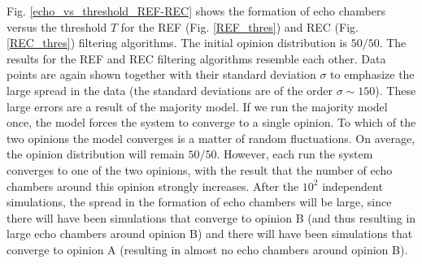 \documentclass[11 pt , letterpaper , twoside , openright]{book}
\begin{document}
Fig. \ref{echo_vs_threshold_REF-REC} shows the formation of echo chambers versus the threshold $T$ for the REF (Fig. \ref{REF_thres}) and REC (Fig. \ref{REC_thres}) filtering algorithms. The initial opinion distribution is $50/50$. The results for the REF and REC filtering algorithms resemble each other. Data points are again shown together with their standard deviation $\sigma$ to emphasize the large spread in the data (the standard deviations are of the order $\sigma \sim 150$). These large errors are a result of the majority model. If we run the majority model once, the model forces the system to converge to a single opinion. To which of the two opinions the model converges is a matter of random fluctuations. On average, the opinion distribution will remain $50/50$. However, each run the system converges to one of the two opinions, with the result that the number of echo chambers around this opinion strongly increases. After the $10^2$ independent simulations, the spread in the formation of echo chambers will be large, since there will have been simulations that converge to opinion B (and thus resulting in large echo chambers around opinion B) and there will have been simulations that converge to opinion A (resulting in almost no echo chambers around opinion B).
\end{document}
